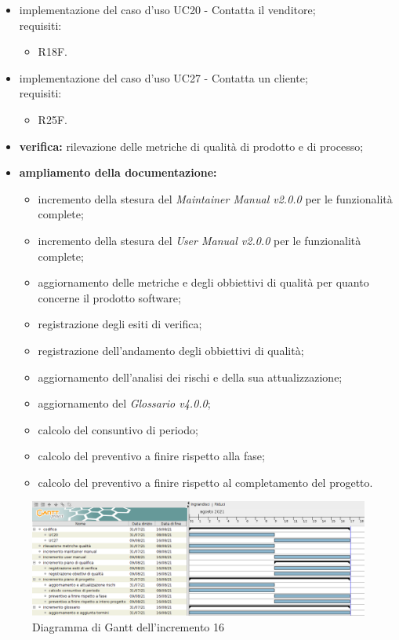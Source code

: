\begin{itemize}
    \item implementazione del caso d'uso UC20 - Contatta il venditore;\\requisiti:
          \begin{itemize}
              \item R18F.
          \end{itemize}
    \item implementazione del caso d'uso UC27 - Contatta un cliente;\\requisiti:
          \begin{itemize}
              \item R25F.
          \end{itemize}
    \item \textbf{verifica:} rilevazione delle metriche di qualità di prodotto e di processo;
    \item \textbf{ampliamento della documentazione:}
          \begin{itemize}
              \item incremento della stesura del \textit{Maintainer Manual v2.0.0} per le funzionalità complete;
              \item incremento della stesura del \textit{User Manual v2.0.0} per le funzionalità complete;
              \item aggiornamento delle metriche e degli obbiettivi di qualità per quanto concerne il prodotto software;
              \item registrazione degli esiti di verifica;
              \item registrazione dell'andamento degli obbiettivi di qualità;
              \item aggiornamento dell'analisi dei rischi e della sua attualizzazione;
              \item aggiornamento del \textit{Glossario v4.0.0};
              \item calcolo del consuntivo di periodo;
              \item calcolo del preventivo a finire rispetto alla fase;
              \item calcolo del preventivo a finire rispetto al completamento del progetto.
          \end{itemize}
\end{itemize}
\pagebreak
{}
\begin{figure}[!ht]
    \caption{Diagramma di Gantt dell'incremento 16}
    \vspace{5px}
    \includegraphics[scale=0.3]{../../../Images/Diagrammi/Gantt/incremento16.png}
    \centering
\end{figure}

